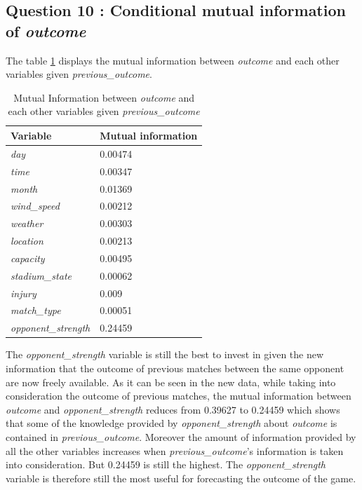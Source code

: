 \documentclass[titlepage]{article}
\begin{document}
\subsection*{Question 10 : Conditional mutual information of \textit{outcome}}
The table \ref{tab:q10} displays the mutual information between \textit{outcome} and each other variables given \textit{previous\_outcome}. 

\begin{table}[h!]
    \centering
    \small
    \setlength{\tabcolsep}{4pt}
    \begin{tabular}{|p{4cm}|p{4cm}|}
        \hline 
        \textbf{Variable} & \textbf{Mutual information}\\
        \hline
        \textit{day} & 0.00474\\
        \hline
        \textit{time} & 0.00347\\
        \hline
        \textit{month} & 0.01369\\
        \hline
        \textit{wind\_speed} & 0.00212\\
        \hline
        \textit{weather} & 0.00303\\
        \hline
        \textit{location} & 0.00213\\
        \hline
        \textit{capacity} & 0.00495\\
        \hline
        \textit{stadium\_state} & 0.00062\\
        \hline
        \textit{injury} & 0.009\\
        \hline
        \textit{match\_type} & 0.00051\\
        \hline
        \textit{opponent\_strength} & 0.24459\\
        \hline
    \end{tabular}
    \caption{Mutual Information between \textit{outcome} and each other variables given \textit{previous\_outcome}}
    \label{tab:q10}
\end{table}

The \textit{opponent\_strength} variable is still the best to invest in given the new information that the outcome of previous matches between the same opponent are now freely available. As it can be seen in the new data, while taking into consideration the outcome of previous matches, the mutual information between \textit{outcome} and \textit{opponent\_strength} reduces from 0.39627 to 0.24459 which shows that some of the knowledge provided by \textit{opponent\_strength} about \textit{outcome} is contained in \textit{previous\_outcome}. Moreover the amount of information provided by all the other variables increases when \textit{previous\_outcome}'s information is taken into consideration. But 0.24459 is still the highest. The \textit{opponent\_strength} variable is therefore still the most useful for forecasting the outcome of the game. 
\end{document}
